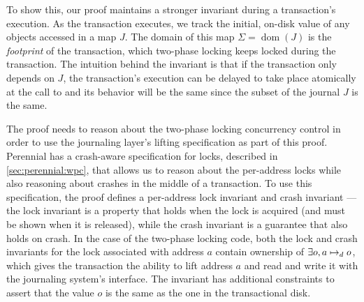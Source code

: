 To show this, our proof maintains a stronger invariant during a transaction's
execution. As the transaction executes, we track the initial, on-disk value of any
objects accessed in a map $J$. The domain of this map
$\Sigma = \operatorname{dom}(J)$ is the \emph{footprint} of the transaction,
which two-phase locking keeps locked during the transaction. The intuition
behind the invariant is that if the transaction only depends on $J$, the
transaction's execution can be delayed to take place atomically at the call to
 and its behavior will be the same since the subset of the journal
$J$ is the same.

The proof needs to reason about the two-phase locking concurrency control in
order to use the journaling layer's lifting specification as part of this proof.
Perennial has a crash-aware specification for locks, described in
\cref{sec:perennial:wpc}, that allows us to reason about the per-address locks
while also reasoning about crashes in the middle of a transaction. To use this
specification, the proof defines a per-address lock invariant and crash
invariant --- the lock invariant is a property that holds when the lock is
acquired (and must be shown when it is released), while the crash invariant is a
guarantee that also holds on crash. In the case of the two-phase locking code,
both the lock and crash invariants for the lock associated with address $a$
contain ownership of $\exists o, a \mapsto_d o$, which gives the transaction
the ability to lift address $a$ and read and write it with the journaling
system's interface. The invariant has additional constraints to assert that the
value $o$ is the same as the one in the transactional disk.

